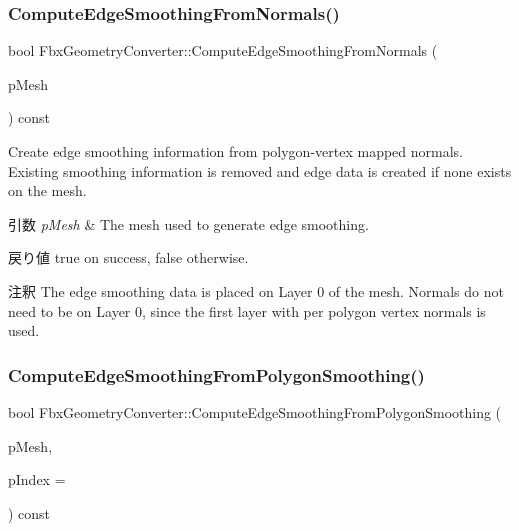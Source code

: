 \subsubsection{\texorpdfstring{Compute\+Edge\+Smoothing\+From\+Normals()}{ComputeEdgeSmoothingFromNormals()}}
{\footnotesize\ttfamily bool Fbx\+Geometry\+Converter\+::\+Compute\+Edge\+Smoothing\+From\+Normals (\begin{DoxyParamCaption}\item[{\hyperlink{class_fbx_mesh}{Fbx\+Mesh} $\ast$}]{p\+Mesh }\end{DoxyParamCaption}) const}

Create edge smoothing information from polygon-\/vertex mapped normals. Existing smoothing information is removed and edge data is created if none exists on the mesh. 
\begin{DoxyParams}{引数}
{\em p\+Mesh} & The mesh used to generate edge smoothing. \\
\hline
\end{DoxyParams}
\begin{DoxyReturn}{戻り値}
{\ttfamily true} on success, {\ttfamily false} otherwise. 
\end{DoxyReturn}
\begin{DoxyRemark}{注釈}
The edge smoothing data is placed on Layer 0 of the mesh. Normals do not need to be on Layer 0, since the first layer with per polygon vertex normals is used. 
\end{DoxyRemark}
\mbox{\label{class_fbx_geometry_converter_a65bb00283eddbd2e2c34b723e134d147}} 
\subsubsection{\texorpdfstring{Compute\+Edge\+Smoothing\+From\+Polygon\+Smoothing()}{ComputeEdgeSmoothingFromPolygonSmoothing()}}
{\footnotesize\ttfamily bool Fbx\+Geometry\+Converter\+::\+Compute\+Edge\+Smoothing\+From\+Polygon\+Smoothing (\begin{DoxyParamCaption}\item[{\hyperlink{class_fbx_mesh}{Fbx\+Mesh} $\ast$}]{p\+Mesh,  }\item[{int}]{p\+Index = {} }\end{DoxyParamCaption}) const}

